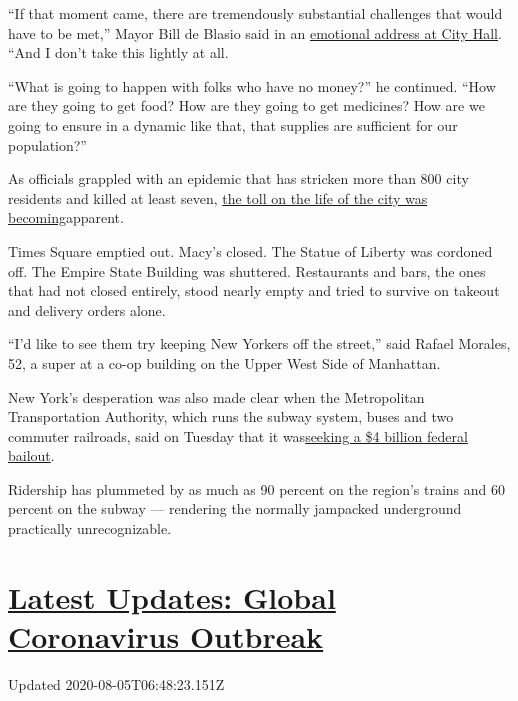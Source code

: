 ``If that moment came, there are tremendously substantial challenges
that would have to be met,'' Mayor Bill de Blasio said in an
\href{https://www.nytimes.com/video/nyregion/100000007039735/nyc-shelter-in-place-de-blasio.html}{emotional
address at City Hall}. ``And I don't take this lightly at all.

``What is going to happen with folks who have no money?'' he continued.
``How are they going to get food? How are they going to get medicines?
How are we going to ensure in a dynamic like that, that supplies are
sufficient for our population?''

As officials grappled with an epidemic that has stricken more than 800
city residents and killed at least seven,
\href{https://www.nytimes.com/2020/03/17/nyregion/coronavirus-new-york-update.html}{the
toll on the life of the city was becoming}apparent.

Times Square emptied out. Macy's closed. The Statue of Liberty was
cordoned off. The Empire State Building was shuttered. Restaurants and
bars, the ones that had not closed entirely, stood nearly empty and
tried to survive on takeout and delivery orders alone.

``I'd like to see them try keeping New Yorkers off the street,'' said
Rafael Morales, 52, a super at a co-op building on the Upper West Side
of Manhattan.

New York's desperation was also made clear when the Metropolitan
Transportation Authority, which runs the subway system, buses and two
commuter railroads, said on Tuesday that it
was\href{https://www.nytimes.com/2020/03/17/nyregion/coronavirus-nyc-subway-federal-aid-.html}{seeking
a \$4 billion federal bailout}.

Ridership has plummeted by as much as 90 percent on the region's trains
and 60 percent on the subway --- rendering the normally jampacked
underground practically unrecognizable.

\hypertarget{latest-updates-global-coronavirus-outbreak}{%
\section{\texorpdfstring{\href{https://www.nytimes.com/2020/08/04/world/coronavirus-cases.html?action=click\&pgtype=Article\&state=default\&region=MAIN_CONTENT_1\&context=storylines_live_updates}{Latest
Updates: Global Coronavirus
Outbreak}}{Latest Updates: Global Coronavirus Outbreak}}\label{latest-updates-global-coronavirus-outbreak}}

Updated 2020-08-05T06:48:23.151Z

